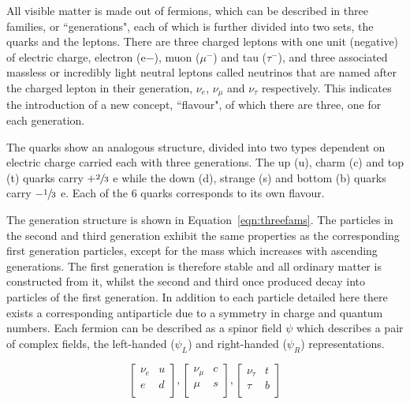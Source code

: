 All visible matter is made out of fermions, which can be described in three families, or ``generations", each of which is further divided into two sets, the quarks and the leptons. There are three charged leptons with one unit (negative) of electric charge, electron (e${-}$), muon ($\mu^{-}$) and tau ($\tau^{-}$), and three associated massless or incredibly light  neutral leptons called neutrinos that are named after the charged lepton in their generation, $\nu_{e}$, $\nu_{\mu}$ and $ \nu_{\tau}$ respectively. This indicates the introduction of a new concept, ``flavour", of which there are three, one for each generation. 

The quarks show an analogous structure, divided into two types dependent on electric charge carried each with three generations. The up (u), charm (c) and top (t) quarks carry $+\sfrac{2}{3}$ e while the down (d), strange (s) and bottom (b) quarks carry $-\sfrac{1}{3}$ e. Each of the 6 quarks corresponds to its own flavour. 

The generation structure is shown in Equation~\ref{eqn:threefams}. The particles in the second and third generation exhibit the same properties as the corresponding first generation particles, except for the mass which increases with ascending generations. The first generation is therefore stable and all ordinary matter is constructed from it, whilst the second and third once produced decay into particles of the first generation. In addition to each particle detailed here there exists a corresponding antiparticle due to a symmetry in charge and quantum numbers.  Each fermion can be described as a spinor field $\psi$ which describes a pair of complex fields, the left-handed ($\psi_{L}$) and right-handed ($\psi_{R}$) representations. 
 
\begin{equation}
\begin{bmatrix}
\nu_{e} & u \\
e & d \\
\end{bmatrix},
\begin{bmatrix}
\nu_{\mu} & c \\
\mu & s \\
\end{bmatrix},
\begin{bmatrix}
\nu_{\tau} & t \\
\tau & b\\
\end{bmatrix}
\label{eqn:threefams}
\end{equation}

